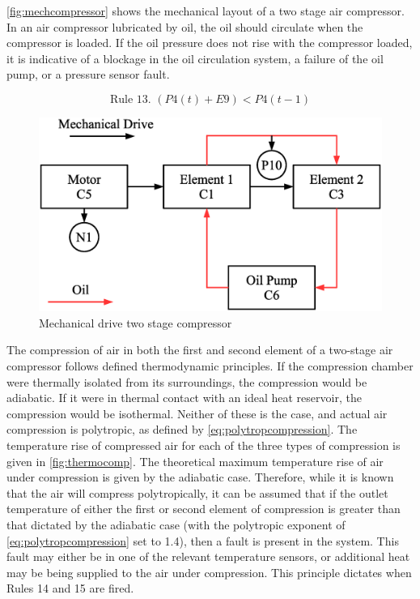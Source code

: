 \autoref{fig:mechcompressor} shows the mechanical layout of a two stage air compressor. In an air compressor lubricated by oil, the oil should circulate when the compressor is loaded. If the oil pressure does not rise with the compressor loaded, it is indicative of a blockage in the oil circulation system, a failure of the oil pump, or a pressure sensor fault.

\begin{equation}
\text{Rule 13. }(P4(t) + E9) < P4(t-1)
\label{eq:rule13}
\end{equation}

\begin{figure}
\includegraphics[width = .9\columnwidth]{./Images/MechanicalCompressor.eps}
\caption{Mechanical drive two stage compressor}
\label{fig:mechcompressor}
\end{figure}

The compression of air in both the first and second element of a two-stage air compressor follows defined thermodynamic principles. If the compression chamber were thermally isolated from its surroundings, the compression would be adiabatic. If it were in thermal contact with an ideal heat reservoir, the compression would be isothermal. Neither of these is the case, and actual air compression is polytropic, as defined by \autoref{eq:polytropcompression}. The temperature rise of compressed air for each of the three types of compression is given in \autoref{fig:thermocomp}. The theoretical maximum temperature rise of air under compression is given by the adiabatic case. Therefore, while it is known that the air will compress polytropically, it can be assumed that if the outlet temperature of either the first or second element of compression is greater than that dictated by the adiabatic case (with the polytropic exponent of \autoref{eq:polytropcompression} set to 1.4), then a fault is present in the system. This fault may either be in one of the relevant temperature sensors, or additional heat may be being supplied to the air under compression. This principle dictates when Rules 14 and 15 are fired.

